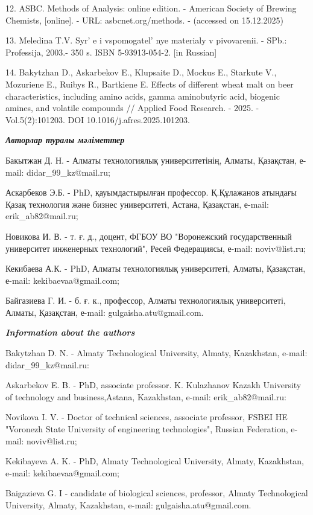 \begin{refs}
12. ASBC. Methods of Analysis: online edition. - American Society of
Brewing Chemists, {[}online{]}. - URL: asbcnet.org/methods. - (accessed
on 15.12.2025)

13. Meledina T.V. Syr' e i
vspomogatel' nye materialy v pivovarenii. - SPb.:
Professija, 2003.- 350 s. ISBN 5-93913-054-2. {[}in Russian{]}

14. Bakytzhan D., Askarbekov E., Klupsaite D., Mockus E., Starkute V.,
Mozuriene E., Ruibys R., Bartkiene E. Effects of different wheat malt on
beer characteristics, including amino acids, gamma aminobutyric acid,
biogenic amines, and volatile compounds // Applied Food Research. -
2025. -Vol.5(2):101203. DOI 10.1016/j.afres.2025.101203.
\end{refs}

\begin{info}
\emph{{\bfseries Авторлар туралы мәліметтер}}

Бакытжан Д. Н. - Алматы технологиялық университетінің, Алматы,
Қазақстан, е-mail: didar\_99\_kz@mail.ru;

Аскарбеков Э.Б. - PhD, қауымдастырылған профессор. Қ.Құлажанов
атындағы Қазақ технология және бизнес университеті, Астана, Қазақстан,
е-mail: erik\_ab82@mail.ru;

Новикова И. В. - т. ғ. д., доцент, ФГБОУ ВО "Воронежский
государственный университет инженерных технологий", Ресей Федерациясы,
е-mail: noviv@list.ru;

Кекибаева А.К. - PhD, Алматы технологиялық университеті, Алматы,
Қазақстан, е-mail: kekibaevaa@gmail.com;

Байгазиева Г. И. - б. ғ. к., профессор, Алматы технологиялық
университеті, Алматы, Қазақстан, е-mail: gulgaisha.atu@gmail.com.

\emph{{\bfseries Information about the authors}}

Bakytzhan D. N. - Almaty Technological University, Almaty, Kazakhstan,
e-mail: didar\_99\_kz@mail.ru:

Askarbekov E. B. - PhD, associate professor. K. Kulazhanov Kazakh
University of technology and business,Astana, Kazakhstan, e-mail:
erik\_ab82@mail.ru:

Novikova I. V. - Doctor of technical sciences, associate professor,
FSBEI HE "Voronezh State University of engineering technologies",
Russian Federation, e-mail: noviv@list.ru;

Kekibayeva A. K. - PhD, Almaty Technological University, Almaty,
Kazakhstan, e-mail: kekibaevaa@gmail.com;

Baigazieva G. I - candidate of biological sciences, professor, Almaty
Technological University, Almaty, Kazakhstan, e-mail:
gulgaisha.atu@gmail.com.
\end{info}
